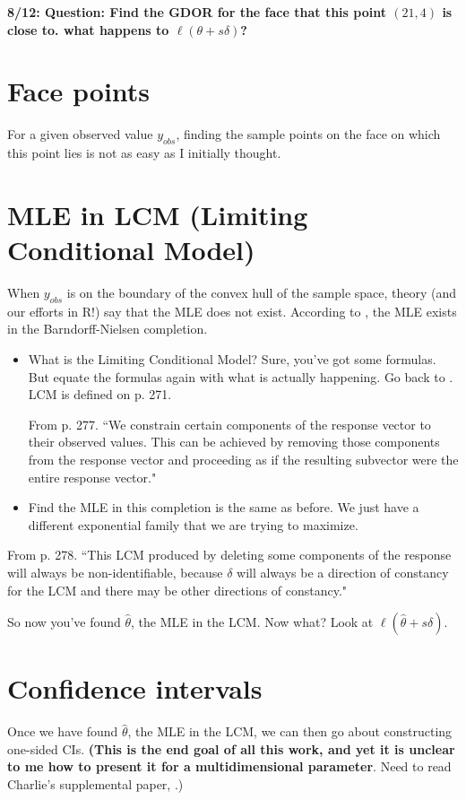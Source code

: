\documentclass{amsbook}
\theoremstyle{definition}
\theoremstyle{remark}
\begin{document}
\textbf{8/12: Question:  Find the GDOR for the face that this point $(21,4)$ is close to.  what happens to $\ell(\theta + s \delta)$?}

\section{Face points}
For a given observed value $y_{obs}$, finding the sample points on the face on which 
this point lies is not as easy as I initially thought.

\section{MLE in LCM (Limiting Conditional Model)}

When $y_{obs}$ is on the boundary of the convex hull of the sample space, theory (and our efforts in R!) say that the MLE does not exist.  According to \citet{Geyer:gdor}, the MLE exists in the Barndorff-Nielsen completion.  
\begin{itemize}
\item What is the Limiting Conditional Model?  Sure, you've got some formulas.  But equate the formulas again 
with what is actually happening.  Go back to \citet[Theorem~6]{Geyer:gdor}.  LCM is 
defined on p. 271.

From p. 277.  ``We constrain certain components of the response vector to their 
observed values.  This can be achieved by removing those components from the response 
vector and proceeding as if the resulting subvector were the entire response vector."
\item Find the MLE in this completion is the same as before.  We just have a different exponential family that we are trying to maximize.
\end{itemize}

From p. 278.  ``This LCM produced by deleting some components of the response will 
always be non-identifiable, because $\delta$ will always be a direction of constancy 
for the LCM and there may be other directions of constancy."

So now you've found $\hat{\theta}$, the MLE in the LCM.  Now what?  Look at $\ell(\hat
{\theta} + s \delta)$.

\section{Confidence intervals}
Once we have found $\hat{\theta}$, the MLE in the LCM, we can then go about 
constructing one-sided CIs.  \textbf{(This is the end goal of all this work, and yet it 
is unclear to me how to present it for a multidimensional parameter}.  Need to read 
Charlie's supplemental paper, \citet{geyer:2008}.)
\end{document}
